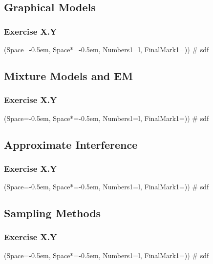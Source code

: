 \documentclass[12pt, a4paper]{article}
\newcommand{\listSpace}{-0.5em}%
\begin{document}
\subsection{Graphical Models}
\subsubsection*{Exercise X.Y}
\begin{easylist}[enumerate]
	\ListProperties(Space=\listSpace, Space*=\listSpace, Numbers1=l, FinalMark1={)})
	# sdf
\end{easylist}

\subsection{Mixture Models and EM}
\subsubsection*{Exercise X.Y}
\begin{easylist}[enumerate]
	\ListProperties(Space=\listSpace, Space*=\listSpace, Numbers1=l, FinalMark1={)})
	# sdf
\end{easylist}

\subsection{Approximate Interference}
\subsubsection*{Exercise X.Y}
\begin{easylist}[enumerate]
	\ListProperties(Space=\listSpace, Space*=\listSpace, Numbers1=l, FinalMark1={)})
	# sdf
\end{easylist}

\subsection{Sampling Methods}
\subsubsection*{Exercise X.Y}
\begin{easylist}[enumerate]
	\ListProperties(Space=\listSpace, Space*=\listSpace, Numbers1=l, FinalMark1={)})
	# sdf
\end{easylist}
\end{document}
